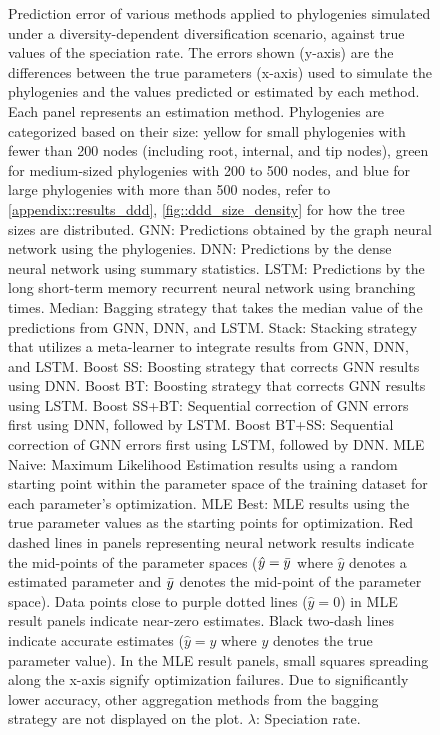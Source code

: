 {\begin{figure}
    \caption{Prediction error of various methods applied to phylogenies simulated under a diversity-dependent diversification scenario, against true values of the speciation rate. The errors shown (y-axis) are the differences between the true parameters (x-axis) used to simulate the phylogenies and the values predicted or estimated by each method. Each panel represents an estimation method. Phylogenies are categorized based on their size: yellow for small phylogenies with fewer than 200 nodes (including root, internal, and tip nodes), green for medium-sized phylogenies with 200 to 500 nodes, and blue for large phylogenies with more than 500 nodes, refer to \autoref{appendix::results_ddd}, \autoref{fig::ddd_size_density} for how the tree sizes are distributed. GNN: Predictions obtained by the graph neural network using the phylogenies. DNN: Predictions by the dense neural network using summary statistics. LSTM: Predictions by the long short-term memory recurrent neural network using branching times. Median: Bagging strategy that takes the median value of the predictions from GNN, DNN, and LSTM. Stack: Stacking strategy that utilizes a meta-learner to integrate results from GNN, DNN, and LSTM. Boost SS: Boosting strategy that corrects GNN results using DNN. Boost BT: Boosting strategy that corrects GNN results using LSTM. Boost SS+BT: Sequential correction of GNN errors first using DNN, followed by LSTM. Boost BT+SS: Sequential correction of GNN errors first using LSTM, followed by DNN. MLE Naive: Maximum Likelihood Estimation results using a random starting point within the parameter space of the training dataset for each parameter's optimization. MLE Best: MLE results using the true parameter values as the starting points for optimization. Red dashed lines in panels representing neural network results indicate the mid-points of the parameter spaces ($\hat{y}=\Bar{y}$ where $\hat{y}$ denotes a estimated parameter and $\Bar{y}$ denotes the mid-point of the parameter space). Data points close to purple dotted lines ($\hat{y}=0$) in MLE result panels indicate near-zero estimates. Black two-dash lines indicate accurate estimates ($\hat{y}=y$ where $y$ denotes the true parameter value). In the MLE result panels, small squares spreading along the x-axis signify optimization failures. Due to significantly lower accuracy, other aggregation methods from the bagging strategy are not displayed on the plot. $\lambda$: Speciation rate.}
    \label{fig::ddd_true_value_lambda}
\end{figure}

}
